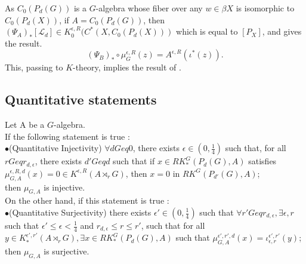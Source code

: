 As $C_0(P_d(G))$ is a $G$-algebra whose fiber over any $w\in\beta X$ is isomorphic to $C_0(P_d(X))$, if $A=C_0(P_d(G))$, then $(\Psi_A)_*[\mathcal L_d]\in K^{\epsilon , R}_0(C^*(X,C_0(P_d(X)))$ which is equal to $[P_X]$, and gives the result.
\[(\Psi_B)_*\circ\mu^{\epsilon,R}_G (z) = A^{\epsilon,R}(\iota^*(z)).\]
This, passing to $K$-theory, implies the result of \cite{SkTuYu}.\\


\subsection{Quantitative statements}

\begin{prop} 
Let A be a $G$-algebra.\\
If the following statement is true :\\

$\bullet$(Quantitative Injectivity) $\forall dGeq 0$, there exists $\epsilon\in (0,\frac{1}{4})$ such that, for all $rGeq r_{d,\epsilon}$, there exists $d'Geq d$ such that if $x\in RK_*^G(P_d(G),A)$ satisfies $\mu_{G,A}^{\epsilon,R,d}(x)=0\in K^{\epsilon,R}(A\rtimes_r G)$, then $x=0$ in $RK^G(P_{d'}(G),A)$;\\

then $\mu_{G,A}$ is injective.\\

On the other hand, if this statement is true : \\

$\bullet$(Quantitative Surjectivity) there exists $\epsilon'\in (0,\frac{1}{4})$ such that $\forall r'Geq r_{d,\epsilon},\exists \epsilon,r$ such that $\epsilon'\leq \epsilon<\frac{1}{4}$ and $r_{d,\epsilon}\leq r\leq r'$, such that for all $y\in K_*^{\epsilon',r'}(A\rtimes_r G),\exists x \in RK_*^G(P_d(G),A)$ such that $\mu_{G,A}^{\epsilon',r',d}(x)=\iota_{\epsilon,r}^{\epsilon',r'}(y)$;\\

then $\mu_{G,A}$ is surjective.
\end{prop}

